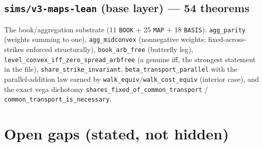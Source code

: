 \documentclass[11pt]{article}
\begin{document}
\subsection{\texttt{sims/v3-maps-lean} (base layer) --- 54 theorems}
The book/aggregation substrate (11 \texttt{BOOK} $+$ 25 \texttt{MAP} $+$ 18 \texttt{BASIS}):
\texttt{agg\_parity} (weights summing to one), \texttt{agg\_midconvex} (nonnegative weights;
fixed-across-strikes enforced structurally), \texttt{book\_arb\_free} (butterfly leg),
\texttt{level\_convex\_iff\_zero\_spread\_arbfree} (a genuine iff, the strongest statement in
the file), \texttt{share\_strike\_invariant}, \texttt{beta\_transport\_parallel} with the
parallel-addition law earned by \texttt{walk\_equiv}/\texttt{walk\_cost\_equiv} (interior
case), and the exact vega dichotomy \texttt{shares\_fixed\_of\_common\_transport} /
\texttt{common\_transport\_is\_necessary}.

\section{Open gaps (stated, not hidden)}\label{sec:gaps}
\end{document}
